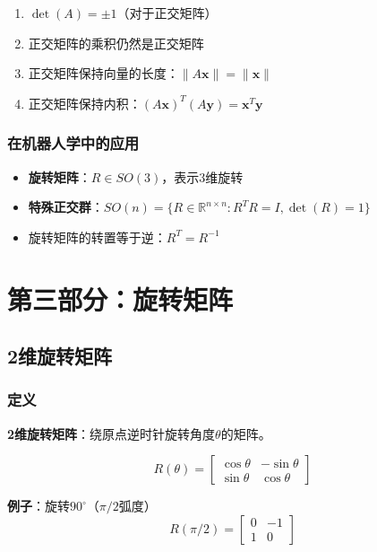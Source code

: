 \documentclass[12pt,a4paper]{article}
\begin{document}
\begin{enumerate}
\item $\det(A) = \pm 1$（对于正交矩阵）
\item 正交矩阵的乘积仍然是正交矩阵
\item 正交矩阵保持向量的长度：$\|A\bm{x}\| = \|\bm{x}\|$
\item 正交矩阵保持内积：$(A\bm{x})^T (A\bm{y}) = \bm{x}^T \bm{y}$
\end{enumerate}

\subsubsection{在机器人学中的应用}

\begin{itemize}
\item \textbf{旋转矩阵}：$R \in SO(3)$，表示3维旋转
\item \textbf{特殊正交群}：$SO(n) = \{R \in \mathbb{R}^{n \times n} : R^T R = I, \det(R) = 1\}$
\item 旋转矩阵的转置等于逆：$R^T = R^{-1}$
\end{itemize}

\section{第三部分：旋转矩阵}

\subsection{2维旋转矩阵}

\subsubsection{定义}

\textbf{2维旋转矩阵}：绕原点逆时针旋转角度$\theta$的矩阵。

\begin{equation}
R(\theta) = \begin{bmatrix} \cos\theta & -\sin\theta \\ \sin\theta & \cos\theta \end{bmatrix}
\end{equation}

\textbf{例子}：旋转$90^\circ$（$\pi/2$弧度）
\begin{equation}
R(\pi/2) = \begin{bmatrix} 0 & -1 \\ 1 & 0 \end{bmatrix}
\end{equation}
\end{document}

